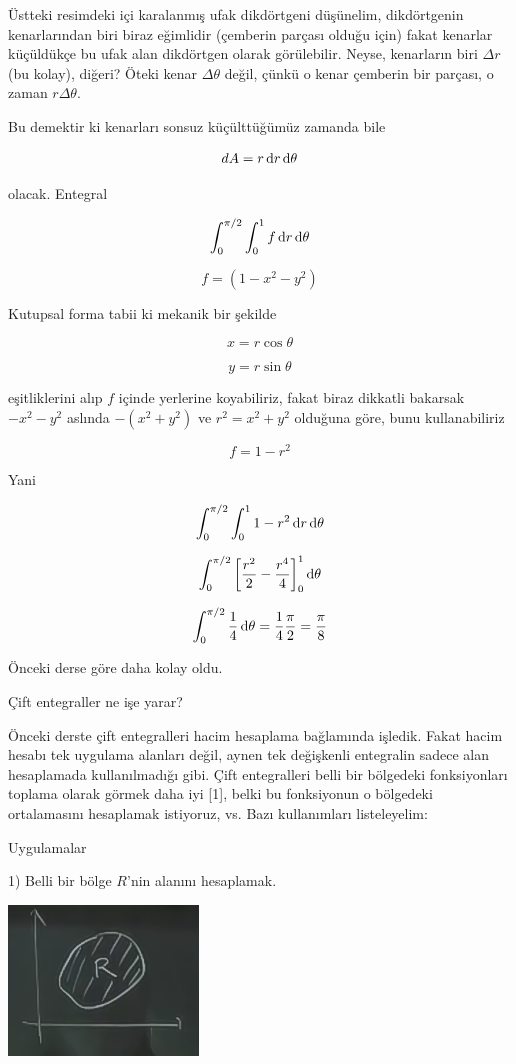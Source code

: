 \documentclass[12pt,fleqn]{article}\usepackage{../../common}
\begin{document}
Üstteki resimdeki içi karalanmış ufak dikdörtgeni düşünelim, dikdörtgenin
kenarlarından biri biraz eğimlidir (çemberin parçası olduğu için) fakat kenarlar
küçüldükçe bu ufak alan dikdörtgen olarak görülebilir. Neyse, kenarların biri
$\Delta r$ (bu kolay), diğeri? Öteki kenar $\Delta \theta$ değil, çünkü o kenar
çemberin bir parçası, o zaman $r \Delta \theta$.

Bu demektir ki kenarları sonsuz küçülttüğümüz zamanda bile 

$$ dA = r \,\mathrm{d} r \,\mathrm{d} \theta $$

olacak. Entegral

$$ \int_0^{\pi/2} \int_0^1  f \,\mathrm{d} r \,\mathrm{d} \theta$$

$$ f =  (1-x^2-y^2)$$

Kutupsal forma tabii ki mekanik bir şekilde

$$ x = r\cos\theta $$

$$ y = r\sin\theta $$

eşitliklerini alıp $f$ içinde yerlerine koyabiliriz, fakat biraz dikkatli
bakarsak $-x^2-y^2$ aslında $-(x^2+y^2)$ ve $r^2=x^2+y^2$ olduğuna göre, bunu
kullanabiliriz

$$ f =   1-r^2 $$

Yani

$$ \int_0^{\pi/2} \int_0^1  1-r^2 \,\mathrm{d} r \,\mathrm{d} \theta$$

$$ \int_0^{\pi/2}  \bigg[ \frac{r^2}{2} - \frac{r^4}{4} \bigg]_0^1 \,\mathrm{d} \theta$$

$$
\int_0^{\pi/2} \frac{1}{4} \,\mathrm{d} \theta =
\frac{1}{4} \frac{\pi}{2} = \frac{\pi}{8}
$$

Önceki derse göre daha kolay oldu. 

Çift entegraller ne işe yarar? 

Önceki derste çift entegralleri hacim hesaplama bağlamında işledik. Fakat
hacim hesabı tek uygulama alanları değil, aynen tek değişkenli entegralin
sadece alan hesaplamada kullanılmadığı gibi. Çift entegralleri
belli bir bölgedeki fonksiyonları toplama olarak görmek daha iyi [1], belki bu
fonksiyonun o bölgedeki ortalamasını hesaplamak istiyoruz, vs. Bazı
kullanımları listeleyelim:

Uygulamalar 

1) Belli bir bölge $R$'nin alanını hesaplamak. 

\begin{center}
\includegraphics[height=4cm]{17_3.png}
\end{center}
\end{document}
